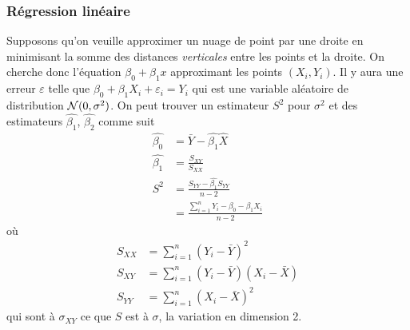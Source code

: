 \subsubsection{Régression linéaire}
Supposons qu'on veuille approximer un nuage de point par une droite en minimisant la somme des distances
\emph{verticales} entre les points et la droite.
On cherche donc l'équation $\beta_0 + \beta_1x$ approximant les points $(X_i, Y_i)$.
Il y aura une erreur $\varepsilon$ telle que $\beta_0 + \beta_1 X_i + \varepsilon_i = Y_i$
qui est une variable aléatoire de distribution $\mathcal{N}(0, \sigma^2)$.
On peut trouver un estimateur $S^2$ pour $\sigma^2$ et des estimateurs $\hat{\beta_1}$, $\hat{\beta_2}$ comme suit
\begin{align*}
  \hat{\beta_0} & = \bar{Y} - \hat{\beta_1}\hat{X}\\
  \hat{\beta_1} & = \frac{S_{XY}}{S_{XX}}\\
  S^2 & = \frac{S_{YY} - \hat{\beta_1}S_{YY}}{n-2}\\
      & = \frac{\sum_{i=1}^n Y_i - \beta_0 - \beta_1 X_i}{n-2}
\end{align*}
où
\begin{align*}
  S_{XX} & = \sum_{i=1}^n (Y_i - \bar{Y})^2\\
  S_{XY} & = \sum_{i=1}^n (Y_i - \bar{Y})(X_i - \bar{X})\\
  S_{YY} & = \sum_{i=1}^n (X_i - \bar{X})^2
\end{align*}
qui sont à $\sigma_{XY}$ ce que $S$ est à $\sigma$, la variation en dimension 2.


